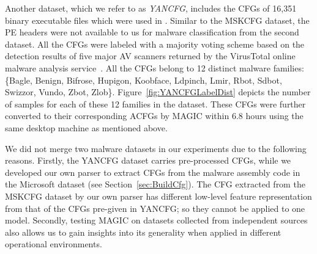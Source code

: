 Another dataset, which we refer to as \textit{YANCFG}, includes the CFGs of 16,351 binary executable files which were used in \cite{YanDataset}.
Similar to the MSKCFG dataset, the PE headers were not available to us for malware classification from the second dataset. All the CFGs were labeled with a majority voting scheme based on the detection results of five major AV scanners returned by the VirusTotal online malware analysis service~\cite{VirusTotal}.
All the CFGs belong to 12 distinct malware families: \{Bagle, Benign, Bifrose, Hupigon, Koobface, Ldpinch, Lmir, Rbot, Sdbot, Swizzor, Vundo, Zbot, Zlob\}.
Figure~\ref{fig:YANCFGLabelDist} depicts the number of samples for each of these 12 families in the dataset.
These CFGs were further converted to their corresponding ACFGs by MAGIC within 6.8 hours using the same desktop machine as mentioned above.


We did not merge two malware datasets in our experiments due to the following reasons.
Firstly, the YANCFG dataset carries pre-processed CFGs,
while we developed our own parser to extract CFGs from the malware assembly code in the Microsoft dataset (see Section~\ref{sec:BuildCfg}).
The CFG extracted from the MSKCFG dataset by our own parser has different low-level feature representation from that of the CFGs pre-given in YANCFG;
so they cannot be applied to one model.
Secondly, testing MAGIC on datasets collected from independent sources also allows us to gain insights into its generality when applied in different operational environments.

